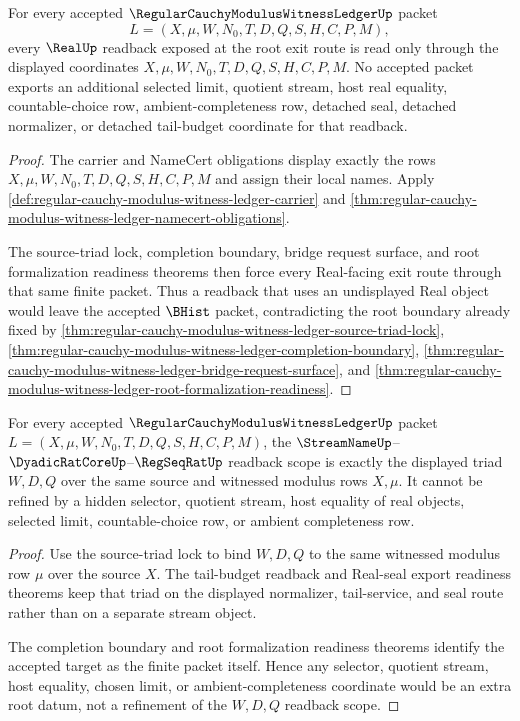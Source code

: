 \begin{theorem}
\label{thm:regular-cauchy-modulus-witness-ledger-real-object-readback-totality}
For every accepted $\RegularCauchyModulusWitnessLedgerUp$ packet
$$
L=(X,\mu,W,N_0,T,D,Q,S,H,C,P,M),
$$
every $\RealUp$ readback exposed at the root exit route is read only through the displayed coordinates $X,\mu,W,N_0,T,D,Q,S,H,C,P,M$. No accepted packet exports an additional selected limit, quotient stream, host real equality, countable-choice row, ambient-completeness row, detached seal, detached normalizer, or detached tail-budget coordinate for that readback.
\end{theorem}
\begin{proof}
The carrier and NameCert obligations display exactly the rows $X,\mu,W,N_0,T,D,Q,S,H,C,P,M$ and assign their local names. Apply \autoref{def:regular-cauchy-modulus-witness-ledger-carrier} and \autoref{thm:regular-cauchy-modulus-witness-ledger-namecert-obligations}.

The source-triad lock, completion boundary, bridge request surface, and root formalization readiness theorems then force every Real-facing exit route through that same finite packet. Thus a readback that uses an undisplayed Real object would leave the accepted $\BHist$ packet, contradicting the root boundary already fixed by \autoref{thm:regular-cauchy-modulus-witness-ledger-source-triad-lock}, \autoref{thm:regular-cauchy-modulus-witness-ledger-completion-boundary}, \autoref{thm:regular-cauchy-modulus-witness-ledger-bridge-request-surface}, and \autoref{thm:regular-cauchy-modulus-witness-ledger-root-formalization-readiness}.
\end{proof}

\begin{theorem}
\label{thm:regular-cauchy-modulus-witness-ledger-streamname-dyadic-readback-scope}
For every accepted $\RegularCauchyModulusWitnessLedgerUp$ packet $L=(X,\mu,W,N_0,T,D,Q,S,H,C,P,M)$, the $\StreamNameUp$--$\DyadicRatCoreUp$--$\RegSeqRatUp$ readback scope is exactly the displayed triad $W,D,Q$ over the same source and witnessed modulus rows $X,\mu$. It cannot be refined by a hidden selector, quotient stream, host equality of real objects, selected limit, countable-choice row, or ambient completeness row.
\end{theorem}
\begin{proof}
Use the source-triad lock to bind $W,D,Q$ to the same witnessed modulus row $\mu$ over the source $X$. The tail-budget readback and Real-seal export readiness theorems keep that triad on the displayed normalizer, tail-service, and seal route rather than on a separate stream object.

The completion boundary and root formalization readiness theorems identify the accepted target as the finite packet itself. Hence any selector, quotient stream, host equality, chosen limit, or ambient-completeness coordinate would be an extra root datum, not a refinement of the $W,D,Q$ readback scope.
\end{proof}

